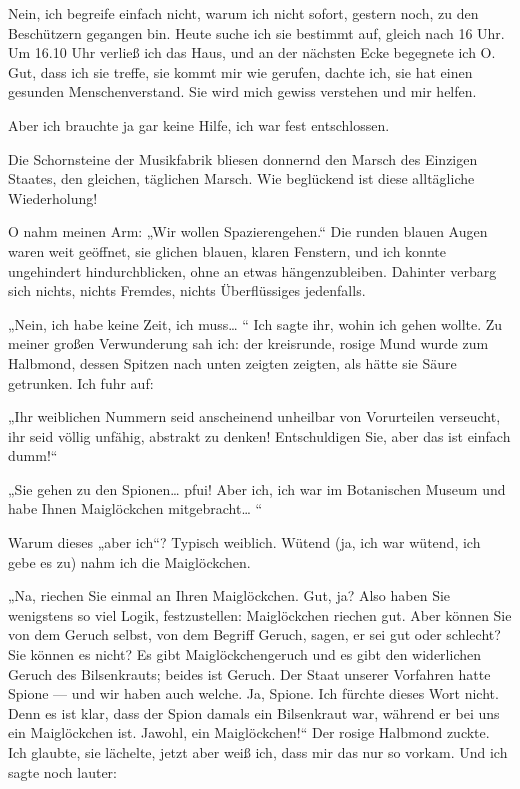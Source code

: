 Nein, ich begreife einfach nicht, warum ich nicht sofort, gestern
noch, zu den Beschützern gegangen bin. Heute suche ich sie bestimmt
auf, gleich nach 16 Uhr. Um 16.10 Uhr verließ ich das Haus, und an
der nächsten Ecke begegnete ich O. Gut, dass ich sie treffe, sie
kommt mir wie gerufen, dachte ich, sie hat einen gesunden
Menschenverstand. Sie wird mich gewiss verstehen und mir helfen.

Aber ich brauchte ja gar keine Hilfe, ich war fest entschlossen.

Die Schornsteine der Musikfabrik bliesen donnernd den Marsch des
Einzigen Staates, den gleichen, täglichen Marsch. Wie beglückend
ist diese alltägliche Wiederholung!

O nahm meinen Arm: „Wir wollen Spazierengehen.“ Die runden blauen
Augen waren weit geöffnet, sie glichen
blauen, klaren Fenstern, und ich konnte ungehindert
hindurchblicken, ohne an etwas hängenzubleiben. Dahinter verbarg
sich nichts, nichts Fremdes, nichts Überflüssiges jedenfalls.

„Nein, ich habe keine Zeit, ich muss\ldots{} “ Ich sagte ihr, wohin ich
gehen wollte. Zu meiner großen Verwunderung sah ich: der
kreisrunde, rosige Mund wurde zum Halbmond, dessen Spitzen nach
unten zeigten zeigten, als hätte sie Säure getrunken. Ich fuhr
auf:

„Ihr weiblichen Nummern seid anscheinend unheilbar von Vorurteilen
verseucht, ihr seid völlig unfähig, abstrakt zu denken!
Entschuldigen Sie, aber das ist einfach dumm!“

„Sie gehen zu den Spionen\ldots{} pfui! Aber ich, ich war im Botanischen
Museum und habe Ihnen Maiglöckchen mitgebracht\ldots{} “

Warum dieses „aber ich“? Typisch weiblich. Wütend (ja, ich war
wütend, ich gebe es zu) nahm ich die Maiglöckchen.

„Na, riechen Sie einmal an Ihren Maiglöckchen. Gut, ja? Also haben
Sie wenigstens so viel Logik, festzustellen: Maiglöckchen riechen
gut. Aber können Sie von dem Geruch selbst, von dem Begriff Geruch,
sagen, er sei gut oder schlecht? Sie können es nicht? Es gibt
Maiglöckchengeruch und es gibt den widerlichen Geruch des
Bilsenkrauts; beides ist Geruch. Der Staat unserer Vorfahren hatte
Spione — und wir haben auch welche. Ja, Spione. Ich fürchte dieses
Wort nicht. Denn es ist klar, dass der Spion damals ein Bilsenkraut
war, während er bei uns ein Maiglöckchen ist. Jawohl, ein
Maiglöckchen!“ Der rosige Halbmond zuckte. Ich glaubte, sie
lächelte, jetzt aber weiß ich, dass mir das nur so vorkam. Und ich
sagte noch lauter:

